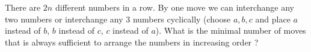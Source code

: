 There are $2n$ different numbers in a row. By one move we can interchange any two numbers or interchange any $3$ numbers cyclically (choose $a,b,c$ and place $a$ instead of $b$,  $b$ instead of $c$,  $c$ instead of $a$). What is the minimal number of moves that is always sufficient to arrange the numbers in increasing order ?